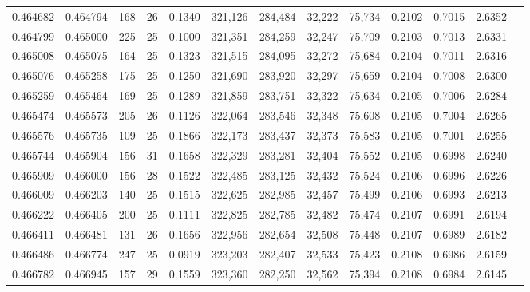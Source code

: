 \begin{tabular}{rrrrrrrrrrrrr}
0.464682 & 0.464794 &   168 &  26 &                                     0.1340 & 321,126 & 284,484 &  32,222 &  75,734 & 0.2102 & 0.7015 & 2.6352 \\
0.464799 & 0.465000 &   225 &  25 &                                     0.1000 & 321,351 & 284,259 &  32,247 &  75,709 & 0.2103 & 0.7013 & 2.6331 \\
0.465008 & 0.465075 &   164 &  25 &                                     0.1323 & 321,515 & 284,095 &  32,272 &  75,684 & 0.2104 & 0.7011 & 2.6316 \\
0.465076 & 0.465258 &   175 &  25 &                                     0.1250 & 321,690 & 283,920 &  32,297 &  75,659 & 0.2104 & 0.7008 & 2.6300 \\
0.465259 & 0.465464 &   169 &  25 &                                     0.1289 & 321,859 & 283,751 &  32,322 &  75,634 & 0.2105 & 0.7006 & 2.6284 \\
0.465474 & 0.465573 &   205 &  26 &                                     0.1126 & 322,064 & 283,546 &  32,348 &  75,608 & 0.2105 & 0.7004 & 2.6265 \\
0.465576 & 0.465735 &   109 &  25 &                                     0.1866 & 322,173 & 283,437 &  32,373 &  75,583 & 0.2105 & 0.7001 & 2.6255 \\
0.465744 & 0.465904 &   156 &  31 &                                     0.1658 & 322,329 & 283,281 &  32,404 &  75,552 & 0.2105 & 0.6998 & 2.6240 \\
0.465909 & 0.466000 &   156 &  28 &                                     0.1522 & 322,485 & 283,125 &  32,432 &  75,524 & 0.2106 & 0.6996 & 2.6226 \\
0.466009 & 0.466203 &   140 &  25 &                                     0.1515 & 322,625 & 282,985 &  32,457 &  75,499 & 0.2106 & 0.6993 & 2.6213 \\
0.466222 & 0.466405 &   200 &  25 &                                     0.1111 & 322,825 & 282,785 &  32,482 &  75,474 & 0.2107 & 0.6991 & 2.6194 \\
0.466411 & 0.466481 &   131 &  26 &                                     0.1656 & 322,956 & 282,654 &  32,508 &  75,448 & 0.2107 & 0.6989 & 2.6182 \\
0.466486 & 0.466774 &   247 &  25 &                                     0.0919 & 323,203 & 282,407 &  32,533 &  75,423 & 0.2108 & 0.6986 & 2.6159 \\
0.466782 & 0.466945 &   157 &  29 &                                     0.1559 & 323,360 & 282,250 &  32,562 &  75,394 & 0.2108 & 0.6984 & 2.6145 \\

\end{tabular}
